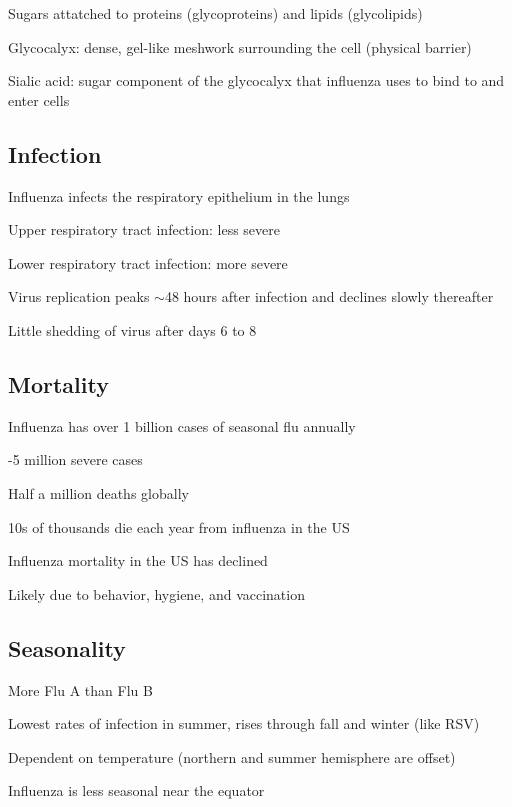 \documentclass{notes}
\begin{document}
Sugars attatched to proteins (glycoproteins) and lipids (glycolipids)

Glycocalyx: dense, gel-like meshwork surrounding the cell (physical barrier)

Sialic acid: sugar component of the glycocalyx that influenza uses to bind to and enter cells

\subsection{Infection}

Influenza infects the respiratory epithelium in the lungs

\tab Upper respiratory tract infection: less severe

\tab Lower respiratory tract infection: more severe

Virus replication peaks \(\sim\)48 hours after infection and declines slowly thereafter

\tab \indicates Little shedding of virus after days 6 to 8


\subsection{Mortality}

Influenza has over 1 billion cases of seasonal flu annually

-5 million severe cases

\tab Half a million deaths globally

\tab \tab 10s of thousands die each year from influenza in the US

Influenza mortality in the US has declined

\tab Likely due to behavior, hygiene, and vaccination

\subsection{Seasonality}

More Flu A than Flu B

Lowest rates of infection in summer, rises through fall and winter (like RSV)

\tab Dependent on temperature (northern and summer hemisphere are offset)

\tab Influenza is less seasonal near the equator
\end{document}
